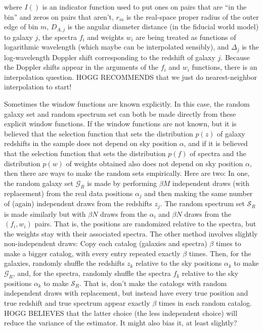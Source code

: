 \documentclass{article}
\newcommand{\set}[1]{\mathscr{#1}}
\begin{document}
where
$I()$ is an indicator function used to put ones on pairs that are ``in the bin'' and zeros on pairs that aren't,
$r_m$ is the real-space proper radius of the outer edge of bin $m$,
$D_{A,j}$ is the angular diameter distance (in the fiducial world model) to galaxy $j$,
the spectra $f_i$ and weights $w_i$ are being treated as functions of logarithmic wavelength (which maybe can be interpolated sensibly),
and $\Delta_j$ is the log-wavelength Doppler shift corresponding to the redshift of galaxy $j$.
Because the Doppler shifts appear in the arguments of the $f_i$ and $w_i$ functions, there is an interpolation question.
HOGG RECOMMENDS that we just do nearest-neighbor interpolation to start!

Sometimes the window functions are known explicitly.
In this case, the random galaxy set and random spectrum set can both be made directly from these explicit window functions.
If the window functions are not known, but it is believed that the selection function that sets the distribution $p(z)$ of galaxy redshifts in the sample does not depend on sky position $\alpha$, and if it is believed that the selection function that sets the distribution $p(f)$ of spectra and the distribution $p(w)$ of weights obtained also does not depend on sky position $\alpha$, then there are ways to make the random sets empirically.
Here are two:
In one, the random galaxy set $\set{G}_R$ is made by performing $\beta M$ independent draws (with replacement) from the real data positions $\alpha_j$ and then making the same number of (again) independent draws from the redshifts $z_j$.
The random spectrum set $\set{S}_R$ is made similarly but with $\beta N$ draws from the $\alpha_i$ and $\beta N$ draws from the $(f_i, w_i)$ pairs.
That is, the positions are randomized relative to the spectra, but the weights stay with their associated spectra.
The other method involves slightly non-independent draws:
Copy each catalog (galaxies and spectra) $\beta$ times to make a bigger catalog, with every entry repeated exactly $\beta$ times.
Then, for the galaxies, randomly shuffle the redshifts $z_k$ relative to the sky positions $\alpha_k$ to make $\set{G}_R$,
and, for the spectra, randomly shuffle the spectra $f_k$ relative to the sky positions $\alpha_k$ to make $\set{S}_R$. 
That is, don't make the catalogs with random independent draws with replacement, but instead have every true position and true redshift and true spectrum appear exactly $\beta$ times in each random catalog.
HOGG BELIEVES that the latter choice (the less independent choice) will reduce the variance of the estimator.
It might also bias it, at least slightly?
\end{document}

